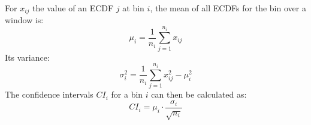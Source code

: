         For $x_{ij}$ the value of an ECDF $j$ at bin $i$, the mean of all ECDFs for the bin over a window is:
            \begin{equation}
                \mu_i = \dfrac{1}{n_i} \sum_{j=1}^{n_i} x_{ij}
                \label{eq:mean_ecdf}
            \end{equation}
        Its variance:
            \begin{equation}
                \sigma^2_i = \dfrac{1}{n_i} \sum_{j=1}^{n_i} x^2_{ij} - \mu^2_i
                \label{eq:var_ecdf}
            \end{equation}
        The confidence intervals $CI_i$ for a bin $i$ can then be calculated as:
        \begin{equation}
            CI_i = \mu_i \cdot \dfrac{\sigma_i}{\sqrt{n_i}}      
            \label{eq:ci_i}
        \end{equation}

